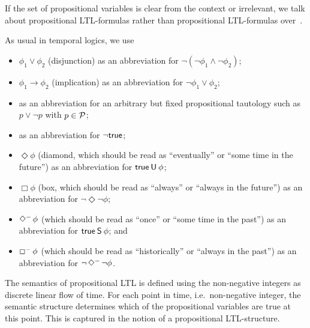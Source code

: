 \noindent
If the set of propositional variables is clear from the context or irrelevant,
we talk about propositional LTL-formulas rather than propositional LTL-formulas
over~\Pmc.

As usual in temporal logics, we use
\begin{itemize}
    \item $\phi_1\lor\phi_2$ (disjunction) as an abbreviation for
        $\lnot(\lnot\phi_1\land\lnot\phi_2)$;
    \item $\phi_1\to\phi_2$ (implication) as an abbreviation for
        $\lnot\phi_1\lor\phi_2$;
    \item \true as an abbreviation for an arbitrary but fixed propositional
        tautology such as $p\lor\lnot p$ with $p\in\mathcal{P}$;
    \item \false as an abbreviation for $\lnot\mathsf{true}$;
    \item $\Diamond\phi$ (diamond, which should be read as \enquote{eventually}
        or \enquote{some time in the future}) as an abbreviation for
        $\mathsf{true}\mathbin{\mathsf{U}}\phi$;
    \item $\Box\phi$ (box, which should be read as \enquote{always} or
        \enquote{always in the future}) as an abbreviation for
        $\lnot\Diamond\lnot\phi$;
    \item $\Diamondm\phi$ (which should be read as \enquote{once}
        or \enquote{some time in the past}) as an abbreviation for
        $\mathsf{true}\mathbin{\mathsf{S}}\phi$; and
    \item $\Boxm\phi$ (which should be read as \enquote{historically} or
        \enquote{always in the past}) as an abbreviation for
        $\lnot\Diamondm\lnot\phi$.
\end{itemize}

The semantics of propositional LTL is defined using the non-negative integers as
discrete linear flow of time.  For each point in time, i.e.~non-negative
integer, the semantic structure determines which of the propositional variables
are true at this point.  This is captured in the notion of a propositional
LTL-structure.

